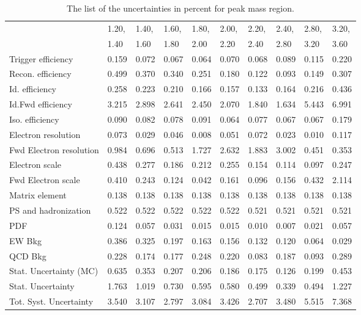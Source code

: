 \begin{table}
\centering
\begin{tabular}{l p{0.6cm}p{0.6cm}p{0.6cm}p{0.6cm}p{0.6cm}p{0.6cm}p{0.6cm}p{0.6cm}l}
\hline \hline
   & 1.20, & 1.40, & 1.60, & 1.80, & 2.00, & 2.20, & 2.40, & 2.80, & 3.20, \\
   & 1.40 & 1.60 & 1.80 & 2.00 & 2.20 & 2.40 & 2.80 & 3.20 & 3.60  \\
\hline
Trigger efficiency            & 0.159 & 0.072 & 0.067 & 0.064 & 0.070 & 0.068 & 0.089 & 0.115 & 0.220 \\
Recon. efficiency             & 0.499 & 0.370 & 0.340 & 0.251 & 0.180 & 0.122 & 0.093 & 0.149 & 0.307 \\
Id. efficiency                & 0.258 & 0.223 & 0.210 & 0.166 & 0.157 & 0.133 & 0.164 & 0.216 & 0.436 \\
Id.Fwd efficiency             & 3.215 & 2.898 & 2.641 & 2.450 & 2.070 & 1.840 & 1.634 & 5.443 & 6.991 \\
Iso. efficiency               & 0.090 & 0.082 & 0.078 & 0.091 & 0.064 & 0.077 & 0.067 & 0.067 & 0.179 \\
Electron resolution           & 0.073 & 0.029 & 0.046 & 0.008 & 0.051 & 0.072 & 0.023 & 0.010 & 0.117 \\
Fwd Electron resolution       & 0.984 & 0.696 & 0.513 & 1.727 & 2.632 & 1.883 & 3.002 & 0.451 & 0.353 \\
Electron scale                & 0.438 & 0.277 & 0.186 & 0.212 & 0.255 & 0.154 & 0.114 & 0.097 & 0.247 \\
Fwd Electron scale            & 0.410 & 0.243 & 0.124 & 0.042 & 0.161 & 0.096 & 0.156 & 0.432 & 2.114 \\
Matrix element                & 0.138 & 0.138 & 0.138 & 0.138 & 0.138 & 0.138 & 0.138 & 0.138 & 0.138 \\
PS and hadronization          & 0.522 & 0.522 & 0.522 & 0.522 & 0.522 & 0.521 & 0.521 & 0.521 & 0.521 \\
PDF                           & 0.124 & 0.057 & 0.031 & 0.015 & 0.015 & 0.010 & 0.007 & 0.021 & 0.057 \\
EW Bkg                        & 0.386 & 0.325 & 0.197 & 0.163 & 0.156 & 0.132 & 0.120 & 0.064 & 0.029 \\
QCD Bkg                       & 0.228 & 0.174 & 0.177 & 0.248 & 0.220 & 0.083 & 0.187 & 0.093 & 0.289 \\
\hline
Stat. Uncertainty (MC)        & 0.635 & 0.353 & 0.207 & 0.206 & 0.186 & 0.175 & 0.126 & 0.199 & 0.453 \\
Stat. Uncertainty             & 1.763 & 1.019 & 0.730 & 0.595 & 0.580 & 0.499 & 0.339 & 0.494 & 1.227 \\
\hline
Tot. Syst. Uncertainty        & 3.540 & 3.107 & 2.797 & 3.084 & 3.426 & 2.707 & 3.480 & 5.515 & 7.368 \\
\hline \hline
\end{tabular}
\caption{The list of the uncertainties in percent for peak mass region.}
\label{tab:Zee_unc_list_peak}
\end{table}

